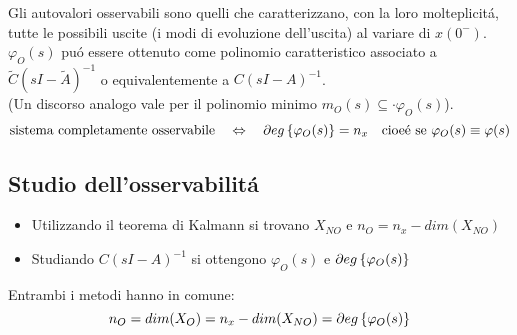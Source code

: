 \documentclass[../main.tex]{subfiles}
\begin{document}
		Gli autovalori osservabili sono quelli che caratterizzano, con la loro molteplicit\'a, tutte le possibili uscite (i modi di evoluzione dell'uscita) al variare di $ x(0^{-}) $. $ \varphi_O(s) $ pu\'o essere ottenuto come polinomio caratteristico associato a $ \tilde C (sI-\tilde A)^{-1} $ o equivalentemente a $ C(sI-A)^{-1} $.\\
		(Un discorso analogo vale per il polinomio minimo $ m_O(s) \subseteq \cdot \varphi_O(s) $).
		\[
			\text{sistema completamente osservabile} \quad\Leftrightarrow\quad \partial eg \left\lbrace \varphi_O(s) \right\rbrace = n_x \quad\text{cioe\'e se}\ \varphi_O(s) \equiv \varphi(s)
		\]
		
	\subsection{Studio dell'osservabilit\'a}
		\begin{itemize}
			\item 
				Utilizzando il teorema di Kalmann si trovano $ X_{NO} $ e $ n_O = n_x - dim(X_{NO}) $
			\item 
				Studiando $ C(sI-A)^{-1} $ si ottengono $ \varphi_O(s) $ e $ \partial eg \left\lbrace \varphi_O(s) \right\rbrace $
		\end{itemize}
		Entrambi i metodi hanno in comune:
		\[
			n_O = dim(X_O) = n_x - dim(X_{NO}) = \partial eg \left\lbrace \varphi_O(s) \right\rbrace
		\]
		
\end{document}
